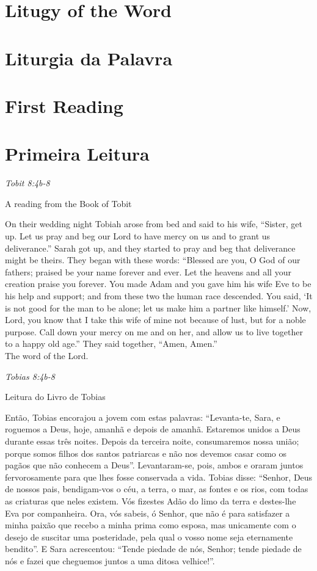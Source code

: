 \documentclass[10pt,a5]{article}
\newcommand \sect[2] {\section*{#1} \switchcolumn \section*{#2} \switchcolumn*}
\begin{document}
\begin{paracol}{2}

 \sect{Litugy of the Word}{Liturgia da Palavra}

 \sect{First Reading}{Primeira Leitura}

 \textit{Tobit 8:4b-8}

\hspace{2em} A reading from the Book of Tobit

On their wedding night Tobiah arose from bed and said to his wife,
“Sister, get up. Let us pray and beg our Lord to have mercy on
us and to grant us deliverance.”
Sarah got up, and they started to pray
and beg that deliverance might be theirs.
They began with these words:
“Blessed are you, O God of our fathers;
praised be your name forever and ever.
Let the heavens and all your creation
praise you forever.
You made Adam and you gave him his wife Eve to be his help
and support;
and from these two the human race descended.
You said, ‘It is not good for the man to be alone;
let us make him a partner like himself.’
Now, Lord, you know that I take this wife of mine not because
of lust,
but for a noble purpose.
Call down your mercy on me and on her,
and allow us to live together to a happy old age.”
They said together, “Amen, Amen.” \\

The word of the Lord. \\


\switchcolumn

\textit{Tobias 8:4b-8}

\hspace{2em} Leitura do Livro de Tobias

Então, Tobias encorajou a jovem com estas palavras: “Levanta-te, Sara, e roguemos a Deus, hoje, amanhã e depois de amanhã. Estaremos unidos a Deus durante essas três noites. Depois da terceira noite, consumaremos nossa união;
porque somos filhos dos santos patriarcas e não nos devemos casar como os pagãos que não conhecem a Deus”.
Levantaram-se, pois, ambos e oraram juntos fervorosamente para que lhes fosse conservada a vida.
Tobias disse: “Senhor, Deus de nossos pais, bendigam-vos o céu, a terra, o mar, as fontes e os rios, com todas as criaturas que neles existem.
Vós fizestes Adão do limo da terra e destes-lhe Eva por companheira.
Ora, vós sa­beis, ó Senhor, que não é para satisfazer a minha paixão que recebo a minha prima como esposa, mas unicamente com o desejo de suscitar uma posteridade, pela qual o vosso nome seja eternamente bendito”.
E Sara acrescentou: “Tende piedade de nós, Senhor; tende piedade de nós e fazei que cheguemos juntos a uma ditosa velhice!”.\\


\end{paracol}
\end{document}
